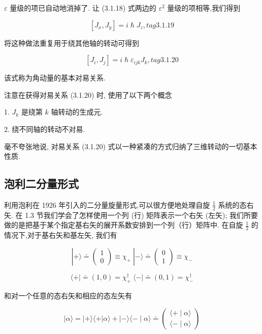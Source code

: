 $\varepsilon$ 量级的项已自动地消掉了. 让 (3.1.18) 式两边的 ${\varepsilon }^{2}$ 量级的项相等,我们得到

$$
\left\lbrack {{J}_{x},{J}_{y}}\right\rbrack = i\hslash {J}_{z}, tag{3.1.19}
$$

将这种做法重复用于绕其他轴的转动可得到

$$
\left\lbrack {{J}_{i},{J}_{j}}\right\rbrack = i\hslash {\varepsilon }_{ijk}{J}_{k}, tag{3.1.20}
$$

该式称为角动量的基本对易关系.

注意在获得对易关系 (3.1.20) 时, 使用了以下两个概念

1. ${J}_{k}$ 是绕第 $k$ 轴转动的生成元.

2. 绕不同轴的转动不对易.

毫不夸张地说, 对易关系 (3.1.20) 式以一种紧凑的方式归纳了三维转动的一切基本性质.


\subsection{泡利二分量形式} 

利用泡利在 1926 年引入的二分量旋量形式,可以很方便地处理自旋 $\frac{1}{2}$ 系统的态右矢. 在 1.3 节我们学会了怎样使用一个列 (行) 矩阵表示一个右矢 (左矢); 我们所要做的是把基于某个指定基右矢的展开系数安排到一个列（行）矩阵中. 在自旋 $\frac{1}{2}$ 的情况下,对于基右矢和基左矢, 我们有

$$
\left| {+\rangle \doteq \left( \begin{array}{l} 1 \\ 0 \end{array}\right) \equiv {\chi }_{ + }\;}\right| - \rangle \doteq \left( \begin{array}{l} 0 \\ 1 \end{array}\right) \equiv {\chi }_{ - } 
$$

$$
\langle + \mid \doteq \left( {1,0}\right) = {\chi }_{ + }^{ \dagger }\;\langle - \mid \doteq \left( {0,1}\right) = {\chi }_{ - }^{ \dagger }
$$

和对一个任意的态右矢和相应的态左矢有

$$
\left| {\alpha \rangle = }\right| + \rangle \langle + \left| {\alpha \rangle + }\right| - \rangle \langle - \mid \alpha \rangle \doteq \left( \begin{array}{l} \langle + \mid \alpha \rangle \\ \langle - \mid \alpha \rangle \end{array}\right) 
$$

